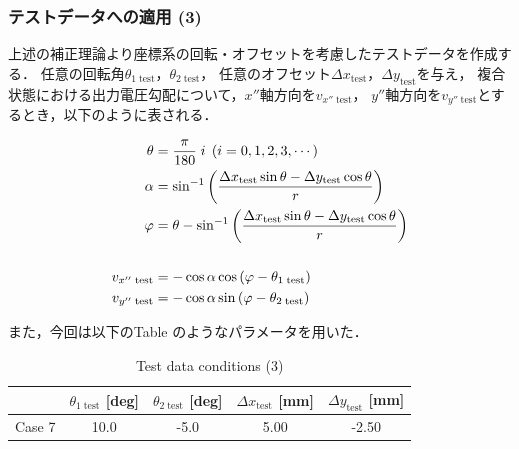\subsubsection{テストデータへの適用 (3)}
上述の補正理論より座標系の回転・オフセットを考慮したテストデータを作成する．
任意の回転角$\theta_{1\;\mathrm{test}}$，$\theta_{2\; \mathrm{test}}$，
任意のオフセット$\Delta x_\mathrm{test}$，$\Delta y_\mathrm{test}$を与え，
複合状態における出力電圧勾配について，$x''$軸方向を$v_{x''\;\mathrm{test}}$，
$y''$軸方向を$v_{y''\;\mathrm{test}}$とするとき，以下のように表される．

\begin{align}
    \theta &= \frac{\pi}{180} \; i \;\left(i = 0, 1, 2, 3, \cdots\right)\\
    \alpha &= \sin^{-1} \left( \frac{\Delta x_\mathrm{test} \sin \theta - \Delta y_\mathrm{test} \cos \theta}{r} \right) \\
    \varphi &= \theta - \sin^{-1}\left(\frac{\Delta x_\mathrm{test} \sin \theta - \Delta y_\mathrm{test} \cos \theta}{r}\right)\\
    \notag \\
    v_{x'' \;\mathrm{test}} &= - \cos \alpha \cos \left(\varphi - \theta_{1\; \mathrm{test}} \right) \\
    v_{y'' \;\mathrm{test}} &= - \cos \alpha \sin \left(\varphi - \theta_{2\; \mathrm{test}}\right) 
\end{align}

また，今回は以下のTable のようなパラメータを用いた．

\begin{table}[htbp]
    \begin{center}
        \caption{Test data conditions (3)}
        \begin{tabular}{|p{30mm}|p{20mm}|p{20mm}|p{20mm}|p{20mm}|}
            \hline
            \multicolumn{1}{|c|}{}       & \multicolumn{1}{|c|}{$\theta_{1\;\mathrm{test}}$ [deg]} & \multicolumn{1}{|c|}{$\theta_{2\;\mathrm{test}}$ [deg]} & \multicolumn{1}{|c|}{$\Delta x_\mathrm{test}$ [mm]} & \multicolumn{1}{|c|}{$\Delta y_\mathrm{test}$ [mm]} \\ \hline
            \multicolumn{1}{|c|}{Case 7}  & \multicolumn{1}{|c|}{10.0}                                & \multicolumn{1}{|c|}{-5.0}                               & \multicolumn{1}{|c|}{5.00}                                       & \multicolumn{1}{|c|}{-2.50}                       \\ \hline
        \end{tabular}
    \end{center}
\end{table}

